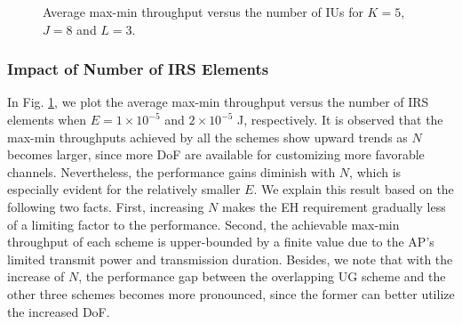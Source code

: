 \documentclass[12pt,draftclsnofoot, onecolumn]{IEEEtran}
\theoremstyle{plain}
\begin{document}
\begin{sloppypar}
\begin{figure}[!t]
	\hspace{-4.5mm}
	\hspace{-8.5mm}
	\vspace{-1mm}
	\caption{Average max-min throughput versus the number of IUs for $K = 5$, $J = 8$ and $L = 3$.}
	\label{fig:R_vs_N}
	\vspace{-3mm}
\end{figure}

\subsubsection{Impact of Number of IRS Elements}
In Fig. \ref{fig:R_vs_N}, we plot the average max-min throughput versus the number of IRS elements when $E = 1 \times 10^{-5}$ and $2 \times 10^{-5}$ J, respectively. It is observed that the max-min throughputs achieved by all the schemes show upward trends as $N$ becomes larger, since more DoF are available for customizing more favorable channels. Nevertheless, the performance gains diminish with $N$, which is especially evident for the relatively smaller $E$. We explain this result based on the following two facts. First, increasing $N$ makes the EH requirement gradually less of a limiting factor to the performance. Second, the achievable max-min throughput of each scheme is upper-bounded by a finite value due to the AP's limited transmit power and transmission duration. Besides, we note that with the increase of $N$, the performance gap between the overlapping UG scheme and the other three schemes becomes more pronounced, since the former can better utilize the increased DoF. 


\end{sloppypar}
\end{document}
